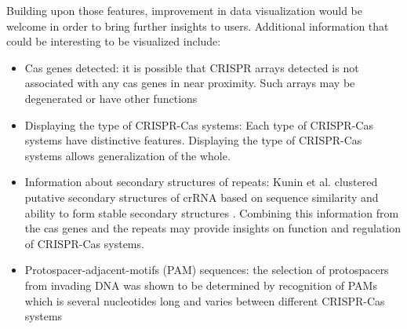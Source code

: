 \documentclass[11pt, a4paper,titlepage]{article}
\begin{document}
Building upon those features, improvement in data visualization would
be welcome in order to bring further insights to users. Additional
information that could be interesting to be visualized include:
\begin{itemize}
\item Cas genes detected: it is possible that CRISPR arrays detected
  is not associated with any cas genes in near proximity. Such arrays
  may be degenerated or have other functions
  \cite{mandin2007identification}
\item Displaying the type of CRISPR-Cas systems: Each type of
  CRISPR-Cas systems have distinctive features. Displaying the type
  of CRISPR-Cas systems allows generalization of the
  whole.\cite{makarova2011evolution,makarova2015updated}
\item Information about secondary structures of repeats: Kunin et
  al. clustered putative secondary structures of crRNA based on
  sequence similarity and ability to form stable secondary structures
  \cite{kunin2007evolutionary}. Combining this information from the
  cas genes and the repeats may provide insights on function and
  regulation of CRISPR-Cas systems.
\item Protospacer-adjacent-motifs (PAM) sequences: the selection of
  protospacers from invading DNA was shown to be determined by
  recognition of PAMs which is several nucleotides long and varies
  between different CRISPR-Cas systems
  \cite{mojica2009short,deveau2008phage}
\end{itemize}


\newpage
 

\end{document}
